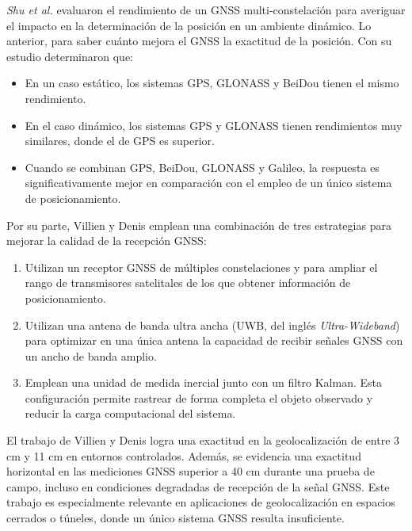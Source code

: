 \textit{Shu et al.}  \citep{Shu} evaluaron el rendimiento de un GNSS multi-constelación para averiguar el impacto en la determinación de la posición en un ambiente dinámico. Lo anterior, para saber cuánto mejora el GNSS la exactitud de la posición. Con su estudio determinaron que:

\begin{itemize}
    \item En un caso estático, los sistemas GPS, GLONASS y BeiDou tienen el mismo rendimiento.
    \item En el caso dinámico, los sistemas GPS y GLONASS tienen rendimientos muy similares, donde el de GPS es superior. 
    \item Cuando se combinan GPS, BeiDou, GLONASS y Galileo, la respuesta es significativamente mejor en comparación con el empleo de un único sistema de posicionamiento. 
\end{itemize}

Por su parte, Villien y Denis \citep{Villien} emplean una combinación de tres estrategias para mejorar la calidad de la recepción GNSS:

\begin{enumerate}
    \item Utilizan un receptor GNSS de múltiples constelaciones y para ampliar el rango de transmisores satelitales de los que obtener información de posicionamiento. 
    \item Utilizan una antena de banda ultra ancha (UWB, del inglés \textit{Ultra-Wideband}) para optimizar en una única antena la capacidad de recibir señales GNSS con un ancho de banda amplio.
    \item Emplean una unidad de medida inercial junto con un filtro Kalman. Esta configuración permite rastrear de forma completa el objeto observado y reducir la carga computacional del sistema.
\end{enumerate}

El trabajo de Villien y Denis logra una exactitud en la geolocalización de entre 3 cm y 11 cm en entornos controlados. Además, se evidencia una exactitud horizontal en las mediciones GNSS superior a 40 cm durante una prueba de campo, incluso en condiciones degradadas de recepción de la señal GNSS. Este trabajo es especialmente relevante en aplicaciones de geolocalización en espacios cerrados o túneles, donde un único sistema GNSS resulta insuficiente. 






